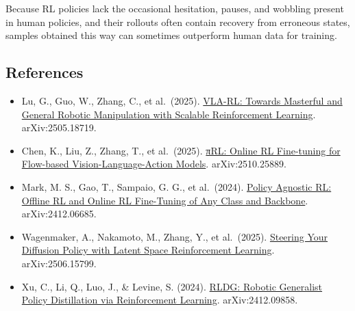Because RL policies lack the occasional hesitation, pauses, and wobbling present in human policies, and their rollouts often contain recovery from erroneous states, samples obtained this way can sometimes outperform human data for training.

\FloatBarrier
{}
\hypertarget{references-153}{%
\subsection{References}\label{references-153}}

\vspace{0.25em}
\begin{itemize}
\tightlist
\item
  Lu, G., Guo, W., Zhang, C., et al.~(2025). \href{https://arxiv.org/abs/2505.18719}{VLA-RL: Towards Masterful and General Robotic Manipulation with Scalable Reinforcement Learning}. arXiv:2505.18719.
\item
  Chen, K., Liu, Z., Zhang, T., et al.~(2025). \href{https://arxiv.org/abs/2510.25889}{πRL: Online RL Fine-tuning for Flow-based Vision-Language-Action Models}. arXiv:2510.25889.
\item
  Mark, M. S., Gao, T., Sampaio, G. G., et al.~(2024). \href{https://arxiv.org/abs/2412.06685}{Policy Agnostic RL: Offline RL and Online RL Fine-Tuning of Any Class and Backbone}. arXiv:2412.06685.
\item
  Wagenmaker, A., Nakamoto, M., Zhang, Y., et al.~(2025). \href{https://arxiv.org/abs/2506.15799}{Steering Your Diffusion Policy with Latent Space Reinforcement Learning}. arXiv:2506.15799.
\item
  Xu, C., Li, Q., Luo, J., \& Levine, S. (2024). \href{https://arxiv.org/abs/2412.09858}{RLDG: Robotic Generalist Policy Distillation via Reinforcement Learning}. arXiv:2412.09858.
\end{itemize}

\clearpage
